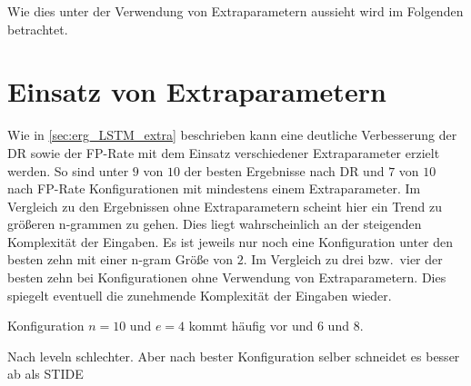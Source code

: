 Wie dies unter der Verwendung von Extraparametern aussieht wird im Folgenden betrachtet.

\section{Einsatz von Extraparametern}

Wie in \autoref{sec:erg_LSTM_extra} beschrieben kann eine deutliche Verbesserung der \ac{DR} sowie  der \ac{FP}-Rate mit dem Einsatz verschiedener Extraparameter erzielt werden.
So sind unter $9$ von $10$ der besten Ergebnisse nach \ac{DR} und $7$ von $10$ nach \ac{FP}-Rate Konfigurationen mit mindestens einem Extraparameter.
Im Vergleich zu den Ergebnissen ohne Extraparametern scheint hier ein Trend zu größeren n-grammen zu gehen.
Dies liegt wahrscheinlich an der steigenden Komplexität der Eingaben.
Es ist jeweils nur noch eine Konfiguration unter den besten zehn mit einer n-gram Größe von $2$.
Im Vergleich zu drei bzw.\ vier der besten zehn bei Konfigurationen ohne Verwendung von Extraparametern.
Dies spiegelt eventuell die zunehmende Komplexität der Eingaben wieder.  

Konfiguration $n=10$ und $e=4$ kommt häufig vor und $6$ und $8$.

Nach leveln schlechter. 
Aber nach bester Konfiguration selber schneidet es besser ab als \ac{STIDE}
